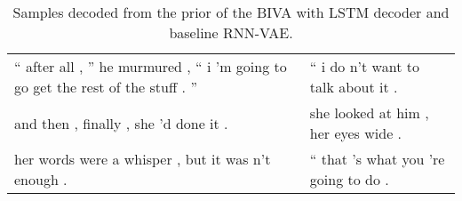 \documentclass{article}
\def\nm{BIVA\xspace}
\begin{document}
\begin{table}[!h]
\begin{center}
{\begin{small}
\begin{tabular}{ll}
              `` after all , '' he murmured , `` i 'm going to go get the rest of the stuff . ''                   &                                                          `` i do n't want to talk about it .                               \\
                                               and then , finally , she 'd done it .                               &                                                         she looked at him , her eyes wide .                                \\
                                    her words were a whisper , but it was n't enough .                             &                                                        `` that 's what you 're going to do .                               \\
\bottomrule
\end{tabular}

\end{small}
}
\end{center}
\caption{Samples decoded from the prior of the \nm with LSTM decoder and baseline RNN-VAE.} \label{table:text-samples}
\end{table}
\end{document}
